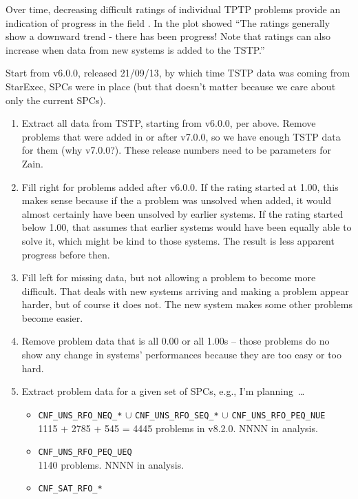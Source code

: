 \documentclass[runningheads]{llncs}
\begin{document}
Over time, decreasing difficult ratings of individual TPTP problems provide an indication of 
progress in the field \cite{SFS01}.
In \cite{Sut17} the plot showed 
``The ratings generally show a downward trend - there has been progress!
Note that ratings can also increase when data from new systems is added to
the TSTP.''

Start from v6.0.0, released 21/09/13, by which time TSTP data was coming from StarExec, SPCs
were in place (but that doesn't matter because we care about only the current SPCs).

\begin{enumerate}
\item Extract all data from TSTP, starting from v6.0.0, per above.
      Remove problems that were added in or after v7.0.0, so we have enough TSTP data for
      them (why v7.0.0?). 
      These release numbers need to be parameters for Zain.
\item Fill right for problems added after v6.0.0.
      If the rating started at 1.00, this makes sense because if the a problem was unsolved
      when added, it would almost certainly have been unsolved by earlier systems.
      If the rating started below 1.00, that assumes that earlier systems would have been
      equally able to solve it, which might be kind to those systems.
      The result is less apparent progress before then.
\item Fill left for missing data, but not allowing a problem to become more difficult.
      That deals with new systems arriving and making a problem appear harder, but of course
      it does not.
      The new system makes some other problems become easier.
\item Remove problem data that is all 0.00 or all 1.00s -- those problems do no show any change
      in systems' performances because they are too easy or too hard.
\item Extract problem data for a given set of SPCs, e.g., I'm planning~\ldots
      \begin{itemize}
      \item {\tt CNF\_UNS\_RFO\_NEQ\_*} $\cup$ {\tt CNF\_UNS\_RFO\_SEQ\_*} $\cup$ 
            {\tt CNF\_UNS\_RFO\_PEQ\_NUE} \\
            1115 + 2785 + 545 = 4445 problems in v8.2.0. NNNN in analysis.
      \item {\tt CNF\_UNS\_RFO\_PEQ\_UEQ} \\
            1140 problems. NNNN in analysis.
      \item {\tt CNF\_SAT\_RFO\_*} \\

\end{itemize}
\end{enumerate}
\end{document}
